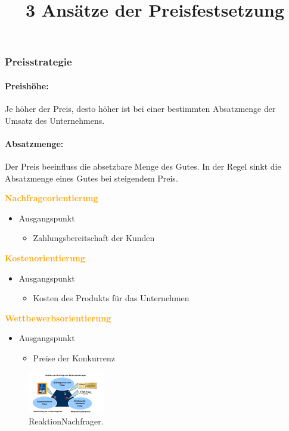 \documentclass[../ZF_Wing.tex]{subfiles}
\begin{document}
\subsubsection{Preisstrategie}

\paragraph{Preishöhe: } Je höher der Preis, desto höher ist bei einer bestimmten Absatzmenge der Umsatz des Unternehmens.\\

\paragraph{Absatzmenge: } Der Preis beeinfluss die absetzbare Menge des Gutes. In der Regel sinkt die Absatzmenge eines Gutes bei steigendem Preis.

\title{3 Ansätze der Preisfestsetzung}

\begin{multicols}{4}
\textcolor {orange} {\textbf{Nachfrageorientierung}}
\begin{itemize}
	\item Ausgangspunkt
	\begin{itemize}
		\item Zahlungsbereitschaft der Kunden
	\end{itemize}
\end{itemize}

\columnbreak

\textcolor {orange} {\textbf{Kostenorientierung}}
\begin{itemize}
	\item Ausgangspunkt
	\begin{itemize}
		\item Kosten des Produkts für das Unternehmen
	\end{itemize}
\end{itemize}

\columnbreak

\textcolor {orange} {\textbf{Wettbewerbsorientierung}}
\begin{itemize}
	\item Ausgangspunkt
	\begin{itemize}
		\item Preise der Konkurrenz
	\end{itemize}
\end{itemize}
	
\columnbreak
\begin{figure}[H]
\centering
\includegraphics[width=0.3\textwidth]{Resources/Image/ReaktionNachfrager.png}
\caption{\label{fig:ReaktionNachfrager}ReaktionNachfrager.}
\end{figure}

\end{multicols}
\end{document}
